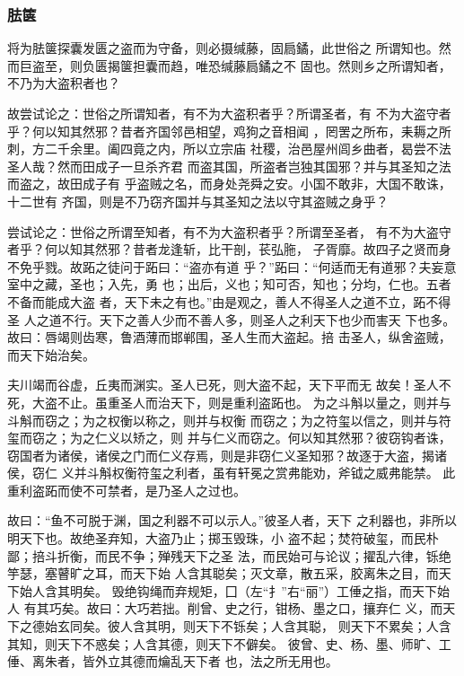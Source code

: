 \documentclass[]{article}
\begin{document}
\hypertarget{header-n702}{%
\subsubsection{胠箧}\label{header-n702}}

将为胠箧探囊发匮之盗而为守备，则必摄缄藤，固扃鐍，此世俗之
所谓知也。然而巨盗至，则负匮揭箧担囊而趋，唯恐缄藤扃鐍之不
固也。然则乡之所谓知者，不乃为大盗积者也？

故尝试论之：世俗之所谓知者，有不为大盗积者乎？所谓圣者，有
不为大盗守者乎？何以知其然邪？昔者齐国邻邑相望，鸡狗之音相闻
，罔罟之所布，耒耨之所刺，方二千余里。阖四竟之内，所以立宗庙
社稷，治邑屋州闾乡曲者，曷尝不法圣人哉？然而田成子一旦杀齐君
而盗其国，所盗者岂独其国邪？并与其圣知之法而盗之，故田成子有
乎盗贼之名，而身处尧舜之安。小国不敢非，大国不敢诛，十二世有
齐国，则是不乃窃齐国并与其圣知之法以守其盗贼之身乎？

尝试论之：世俗之所谓至知者，有不为大盗积者乎？所谓至圣者，
有不为大盗守者乎？何以知其然邪？昔者龙逢斩，比干剖，苌弘胣，
子胥靡。故四子之贤而身不免乎戮。故跖之徒问于跖曰：``盗亦有道
乎？''跖曰：``何适而无有道邪？夫妄意室中之藏，圣也；入先，勇
也；出后，义也；知可否，知也；分均，仁也。五者不备而能成大盗
者，天下未之有也。''由是观之，善人不得圣人之道不立，跖不得圣
人之道不行。天下之善人少而不善人多，则圣人之利天下也少而害天
下也多。故曰：唇竭则齿寒，鲁酒薄而邯郸围，圣人生而大盗起。掊
击圣人，纵舍盗贼，而天下始治矣。

夫川竭而谷虚，丘夷而渊实。圣人已死，则大盗不起，天下平而无
故矣！圣人不死，大盗不止。虽重圣人而治天下，则是重利盗跖也。
为之斗斛以量之，则并与斗斛而窃之；为之权衡以称之，则并与权衡
而窃之；为之符玺以信之，则并与符玺而窃之；为之仁义以矫之，则
并与仁义而窃之。何以知其然邪？彼窃钩者诛，窃国者为诸侯，诸侯之门而仁义存焉，则是非窃仁义圣知邪？故逐于大盗，揭诸侯，窃仁
义并斗斛权衡符玺之利者，虽有轩冕之赏弗能劝，斧钺之威弗能禁。
此重利盗跖而使不可禁者，是乃圣人之过也。

故曰：``鱼不可脱于渊，国之利器不可以示人。''彼圣人者，天下
之利器也，非所以明天下也。故绝圣弃知，大盗乃止；掷玉毁珠，小
盗不起；焚符破玺，而民朴鄙；掊斗折衡，而民不争；殚残天下之圣
法，而民始可与论议；擢乱六律，铄绝竽瑟，塞瞽旷之耳，而天下始
人含其聪矣；灭文章，散五采，胶离朱之目，而天下始人含其明矣。
毁绝钩绳而弃规矩，囗（左``扌''右``丽''）工倕之指，而天下始人
有其巧矣。故曰：大巧若拙。削曾、史之行，钳杨、墨之口，攘弃仁
义，而天下之德始玄同矣。彼人含其明，则天下不铄矣；人含其聪，
则天下不累矣；人含其知，则天下不惑矣；人含其德，则天下不僻矣。
彼曾、史、杨、墨、师旷、工倕、离朱者，皆外立其德而爚乱天下者
也，法之所无用也。
\end{document}
